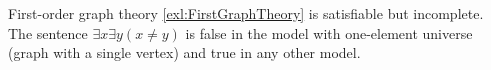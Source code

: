 

\setcounter{section}{3}
\setcounter{subsection}{1}
\setcounter{dfn}{7}

\begin{exl}
First-order graph theory \ref{exl:FirstGraphTheory} is satisfiable but incomplete.
The sentence $\exists x \exists y (x \ne y)$ is false in the model with one-element universe (graph with a single vertex) and true in any other model.
\end{exl}


